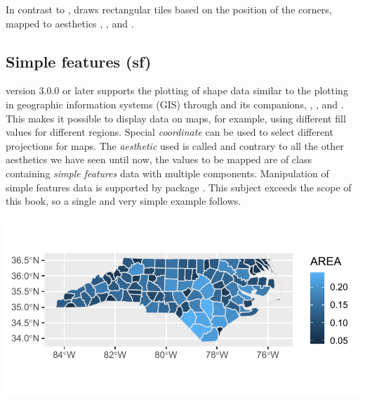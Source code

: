 \documentclass[krantz2]{krantz}\usepackage{knitr}
\begin{document}
In contrast to ,  draws rectangular tiles based on the position of the corners, mapped to aesthetics , ,  and .


\subsection{Simple features (sf)}\label{sec:plot:sf}

\ggplot version 3.0.0 or later supports the plotting of shape data similar to the plotting in geographic information systems (GIS) through  and its companions, , , and . This makes it possible to display data on maps, for example, using different fill values for different regions. Special \emph{coordinate}  can be used to select different projections for maps. The \emph{aesthetic} used is called  and contrary to all the other aesthetics we have seen until now, the values to be mapped are of class  containing \emph{simple features} data with multiple components. Manipulation of simple features data is supported by package . This subject exceeds the scope of this book, so a single and very simple example follows.

\begin{knitrout}\footnotesize
{}\color{fgcolor}\begin{kframe}
\begin{alltt}
 \hlkwb{<-} \hlopt{::}\hlstd{(}\hlstd{(}\hlstd{,}  \hlstd{=} \hlstd{),}  \hlstd{=} \hlstd{)}
 \hlopt{+}
  \hlstd{(}\hlstd{(}   \hlstd{=} \hlstd{)}
\end{alltt}
\end{kframe}

{\centering \includegraphics[width=.7\textwidth]{figure/pos-sf_plot-01-1} 

}


\end{knitrout}
\end{document}
